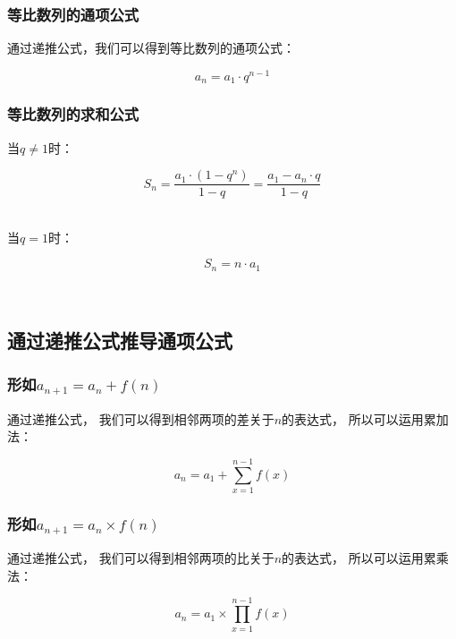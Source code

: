 \documentclass[UTF8]{ctexart}
\begin{document}
\subsubsection{等比数列的通项公式}
    通过递推公式，我们可以得到等比数列的通项公式：
    \begin{large}
    \begin{equation*}
        a_n=a_1\cdot q^{n-1}
    \end{equation*}
    \end{large}

\subsubsection{等比数列的求和公式}
    当$q\neq1$时：
    \begin{large}
    \begin{equation*}
        S_n=\frac{a_1\cdot(1-q^n)}{1-q}=\frac{a_1-a_n\cdot q}{1-q}
    \end{equation*}
    \end{large}\\
    当$q=1$时：
    \begin{large}
    \begin{equation*}
        S_n=n\cdot a_1
    \end{equation*}
    \end{large}\\

\subsection{通过递推公式推导通项公式}

\subsubsection{形如{\large$a_{n+1}=a_n+f(n)$}}
    通过递推公式，
    我们可以得到相邻两项的差关于$n$的表达式，
    所以可以运用累加法：
    \begin{large}
    \begin{equation*}
        a_n=a_1+\sum_{x=1}^{n-1}f(x)
    \end{equation*}
    \end{large}

\subsubsection{形如{\large$a_{n+1}=a_n\times f(n)$}}
    通过递推公式，
    我们可以得到相邻两项的比关于$n$的表达式，
    所以可以运用累乘法：
    \begin{large}
    \begin{equation*}
        a_n=a_1\times\prod_{x=1}^{n-1}f(x)
    \end{equation*}
    \end{large}
\end{document}
